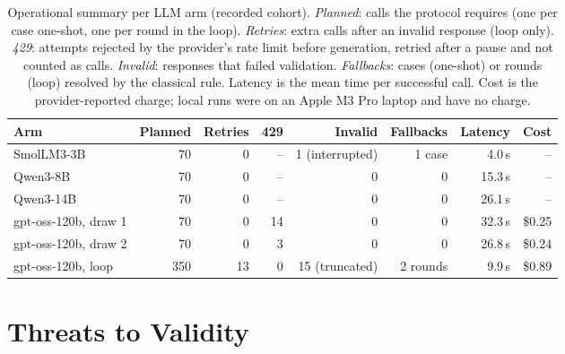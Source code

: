 \begin{table}[t]
\centering
\caption{Operational summary per LLM arm (recorded cohort). \emph{Planned}: calls the protocol requires (one per case one-shot, one per round in the loop). \emph{Retries}: extra calls after an invalid response (loop only). \emph{429}: attempts rejected by the provider's rate limit before generation, retried after a pause and not counted as calls. \emph{Invalid}: responses that failed validation. \emph{Fallbacks}: cases (one-shot) or rounds (loop) resolved by the classical rule. Latency is the mean time per successful call. Cost is the provider-reported charge; local runs were on an Apple M3 Pro laptop and have no charge.}
\label{tab:ops}
\small
\setlength{\tabcolsep}{4pt}
\begin{tabular}{lrrrrrrr}
\toprule
Arm & Planned & Retries & 429 & Invalid & Fallbacks & Latency & Cost \\
\midrule
SmolLM3-3B & 70 & 0 & -- & 1 (interrupted) & 1 case & 4.0\,s & -- \\
Qwen3-8B & 70 & 0 & -- & 0 & 0 & 15.3\,s & -- \\
Qwen3-14B & 70 & 0 & -- & 0 & 0 & 26.1\,s & -- \\
gpt-oss-120b, draw 1 & 70 & 0 & 14 & 0 & 0 & 32.3\,s & \$0.25 \\
gpt-oss-120b, draw 2 & 70 & 0 & 3 & 0 & 0 & 26.8\,s & \$0.24 \\
gpt-oss-120b, loop & 350 & 13 & 0 & 15 (truncated) & 2 rounds & 9.9\,s & \$0.89 \\
\bottomrule
\end{tabular}
\end{table}

\section{Threats to Validity}

